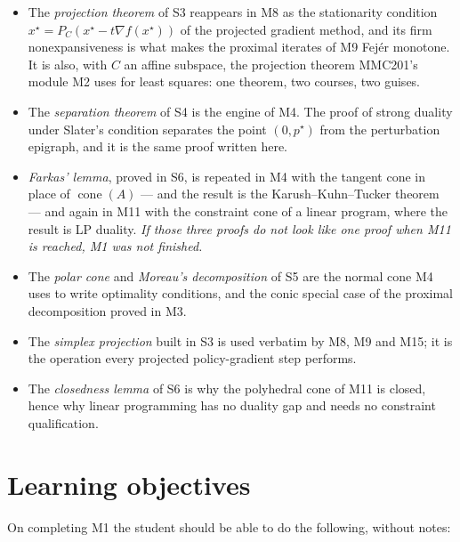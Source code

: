 \documentclass[11pt,a4paper]{article}
\theoremstyle{definition}
\theoremstyle{plain}
\theoremstyle{remark}
\newcommand{\proj}{P}
\DeclareMathOperator{\cone}{cone}
\begin{document}
\begin{itemize}
\item The \emph{projection theorem} of S3 reappears in M8 as the stationarity condition
$x^\star=\proj_C(x^\star-t\nabla f(x^\star))$ of the projected gradient method, and its firm
nonexpansiveness is what makes the proximal iterates of M9 Fej\'er monotone. It is also, with
$C$ an affine subspace, the projection theorem MMC201's module M2 uses for least squares: one
theorem, two courses, two guises.
\item The \emph{separation theorem} of S4 is the engine of M4. The proof of strong duality
under Slater's condition separates the point $(0,p^\star)$ from the perturbation epigraph, and
it is the same proof written here.
\item \emph{Farkas' lemma}, proved in S6, is repeated in M4 with the tangent cone in place of
$\cone(A)$ --- and the result is the Karush--Kuhn--Tucker theorem --- and again in M11 with the
constraint cone of a linear program, where the result is LP duality. \emph{If those three
proofs do not look like one proof when M11 is reached, M1 was not finished.}
\item The \emph{polar cone} and \emph{Moreau's decomposition} of S5 are the normal cone M4 uses
to write optimality conditions, and the conic special case of the proximal decomposition proved
in M3.
\item The \emph{simplex projection} built in S3 is used verbatim by M8, M9 and M15; it is the
operation every projected policy-gradient step performs.
\item The \emph{closedness lemma} of S6 is why the polyhedral cone of M11 is closed, hence why
linear programming has no duality gap and needs no constraint qualification.
\end{itemize}

\section{Learning objectives}

On completing M1 the student should be able to do the following, without notes:
\end{document}

